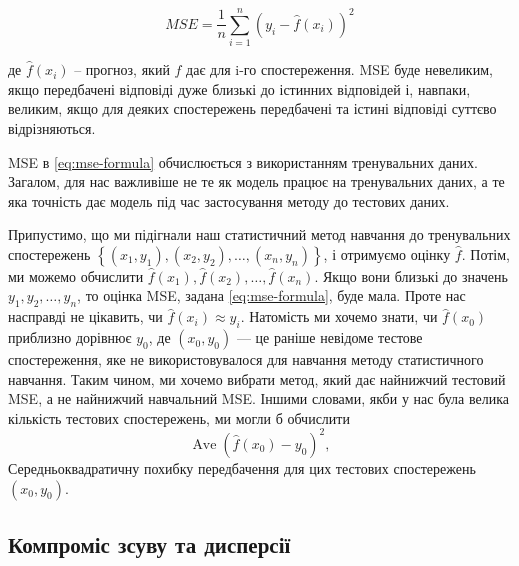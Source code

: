 \documentclass[14pt,a4paper]{extarticle}
\newcounter{e}
\numberwithin{equation}{section}
\numberwithin{figure}{section}
\begin{document}
    \begin{equation}
        \label{eq:mse-formula}
    M S E=\frac{1}{n} \sum_{i=1}^{n}\left(y_{i}-\hat{f}\left(x_{i}\right)\right)^{2}
    \end{equation}

    де $\hat{f}(x_{i})$ – прогноз, який $\hat{f}$ дає для i-го спостереження. MSE буде невеликим, якщо передбачені відповіді дуже близькі до істинних відповідей і, навпаки, великим, якщо для деяких спостережень передбачені та істині відповіді суттєво відрізняються. \newline
    
    MSE в \ref{eq:mse-formula} обчислюється з використанням тренувальних даних. Загалом, для нас важливіше не те як модель працює на тренувальних даних, а те яка точність дає модель під час застосування методу до тестових даних. \newline
    
    Припустимо, що ми підігнали наш статистичний метод навчання до тренувальних спостережень $\left\{\left(x_{1}, y_{1}\right),\left(x_{2}, y_{2}\right), \ldots,\left(x_{n}, y_{n}\right)\right\}$, і отримуємо оцінку $\hat{f}$. Потім, ми можемо обчислити $\hat{f}(x_{1}), \hat{f}(x_{2}), \ldots, \hat{f}(x_{n})$. Якщо вони близькі до значень $y_{1}, y_{2}, \ldots, y_{n}$, то оцінка MSE, задана \ref{eq:mse-formula}, буде мала. Проте нас насправді не цікавить, чи $\hat{f}(x_{i}) \approx y_{i}$. Натомість ми хочемо знати, чи $\hat{f}(x_{0})$ приблизно дорівнює  $y_{0}$, де $\left(x_{0}, y_{0}\right)$ — це раніше невідоме тестове спостереження, яке не використовувалося для навчання методу статистичного навчання. Таким чином, ми хочемо вибрати метод, який дає найнижчий тестовий MSE, а не найнижчий навчальний MSE. \newline
	Іншими словами, якби у нас була велика кількість тестових спостережень, ми могли б обчислити
    \begin{equation}
        \label{eq:mse-formula-decomposition}
        \operatorname{Ave}\left(\hat{f}\left(x_{0}\right)-y_{0}\right)^{2},
    \end{equation}
    Середньоквадратичну похибку передбачення для цих тестових спостережень $\left(x_{0}, y_{0}\right)$. \newline
    
    \subsection{Компроміс зсуву та дисперсії}
    
\end{document}
